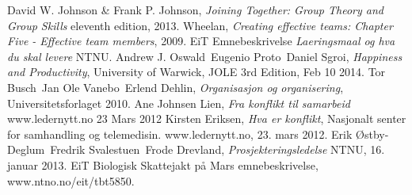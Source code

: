 \begin{thebibliography}{99}	%
		David W. Johnson \& Frank P. Johnson,
		\emph{Joining Together: Group Theory and Group Skills}
		eleventh edition,
		2013.
		Wheelan,
		\emph{Creating effective teams: Chapter Five - Effective team members},
		2009.
		EiT Emnebeskrivelse
		\emph{Laeringsmaal og hva du skal levere}
		NTNU.
		Andrew J. Oswald\, Eugenio Proto\, Daniel Sgroi,
		\emph{Happiness and Productivity},
		University of Warwick,
		JOLE 3rd Edition, Feb 10 2014.
		Tor Busch\, Jan Ole Vanebo\, Erlend Dehlin,
		\emph{Organisasjon og organisering},
		Universitetsforlaget 2010.
		Ane Johnsen Lien,
		\emph{Fra konflikt til samarbeid}
		www.ledernytt.no
		23 Mars 2012
		Kirsten Eriksen,
		\emph{Hva er konflikt},
		Nasjonalt senter for samhandling og telemedisin. 
		www.ledernytt.no,
		23. mars 2012.
		Erik Østby-Deglum\, Fredrik Svalestuen\, Frode Drevland,
		\emph{Prosjekteringsledelse}
		NTNU,
		16. januar 2013.
		EiT Biologisk Skattejakt på Mars emnebeskrivelse,
		www.ntno.no/eit/tbt5850.
		

\end{thebibliography}